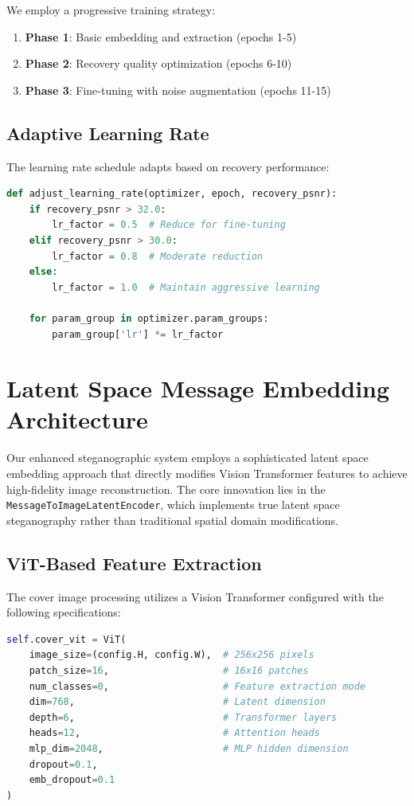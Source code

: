 \documentclass[12pt,a4paper]{report}
\begin{document}
We employ a progressive training strategy:

\begin{enumerate}
    \item \textbf{Phase 1}: Basic embedding and extraction (epochs 1-5)
    \item \textbf{Phase 2}: Recovery quality optimization (epochs 6-10)
    \item \textbf{Phase 3}: Fine-tuning with noise augmentation (epochs 11-15)
\end{enumerate}

\subsection{Adaptive Learning Rate}

The learning rate schedule adapts based on recovery performance:

\begin{lstlisting}[language=Python, caption=Adaptive Learning Rate]
def adjust_learning_rate(optimizer, epoch, recovery_psnr):
    if recovery_psnr > 32.0:
        lr_factor = 0.5  # Reduce for fine-tuning
    elif recovery_psnr > 30.0:
        lr_factor = 0.8  # Moderate reduction
    else:
        lr_factor = 1.0  # Maintain aggressive learning
    
    for param_group in optimizer.param_groups:
        param_group['lr'] *= lr_factor
\end{lstlisting}

\section{Latent Space Message Embedding Architecture}

Our enhanced steganographic system employs a sophisticated latent space embedding approach that directly modifies Vision Transformer features to achieve high-fidelity image reconstruction. The core innovation lies in the \texttt{MessageToImageLatentEncoder}, which implements true latent space steganography rather than traditional spatial domain modifications.

\subsection{ViT-Based Feature Extraction}

The cover image processing utilizes a Vision Transformer configured with the following specifications:

\begin{lstlisting}[language=Python, caption=ViT Configuration for Latent Embedding]
self.cover_vit = ViT(
    image_size=(config.H, config.W),  # 256x256 pixels
    patch_size=16,                    # 16x16 patches
    num_classes=0,                    # Feature extraction mode
    dim=768,                          # Latent dimension
    depth=6,                          # Transformer layers
    heads=12,                         # Attention heads
    mlp_dim=2048,                     # MLP hidden dimension
    dropout=0.1,
    emb_dropout=0.1
)
\end{lstlisting}
\end{document}
